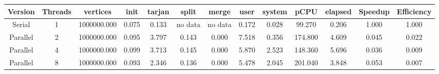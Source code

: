 \begin{tabular}{|c|c|c|c|c|c|c|c|c|c|c|c|c|}
\toprule
 Version &  Threads &    vertices &  init &  tarjan &   split &   merge &  user &  system &    pCPU &  elapsed &  Speedup &  Efficiency \\
\midrule
  Serial &        1 & 1000000.000 & 0.075 &   0.133 & no data & no data & 0.172 &   0.028 &  99.270 &    0.206 &    1.000 &       1.000 \\
Parallel &        2 & 1000000.000 & 0.095 &   3.797 &   0.143 &   0.000 & 7.518 &   0.356 & 174.800 &    4.609 &    0.045 &       0.022 \\
Parallel &        4 & 1000000.000 & 0.099 &   3.713 &   0.145 &   0.000 & 5.870 &   2.523 & 148.360 &    5.696 &    0.036 &       0.009 \\
Parallel &        8 & 1000000.000 & 0.093 &   2.346 &   0.136 &   0.000 & 5.478 &   2.045 & 201.040 &    3.848 &    0.053 &       0.007 \\
\bottomrule
\end{tabular}
